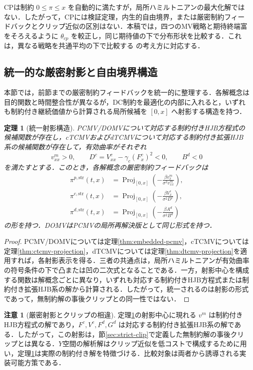\documentclass[10pt,a4paper]{article}
\theoremstyle{plain}
\newtheorem{theorem}{定理}
\theoremstyle{definition}
\newtheorem{remark}{注意}
\DeclareMathOperator{\Proj}{Proj}
\begin{document}
CPは制約 $0\leq\pi\leq x$ を自動的に満たすが，局所ハミルトニアンの最大化解ではない．したがって，CPには検証定理，内生的自由境界，または厳密制約フィードバックとクリップ近似の区別はない．本稿では，四つのMV戦略と期待終端富をそろえるように $\theta_{cp}$ を較正し，同じ期待値の下で分布形状を比較する．これは，異なる戦略を共通平均の下で比較する \citet{vanStadenDangForsyth2021} の考え方に対応する．

\subsection{統一的な厳密射影と自由境界構造}
\label{sec:unified}

本節では，前節までの厳密制約フィードバックを統一的に整理する．各解概念は目的関数と時間整合性が異なるが，DC制約を最適化の内部に入れると，いずれも制約付き継続価値から計算される局所候補を $[0,x]$ へ射影する構造を持つ．

\begin{theorem}[統一射影構造]
\label{thm:unified}
PCMV/DOMVについて対応する制約付きHJB方程式の候補関数が存在し，cTCMVおよびdTCMVについて対応する制約付き拡張HJB系の候補関数が存在して，有効曲率がそれぞれ
\[
  v_{xx}^m>0,
  \qquad
  D^c=V_{xx}^c-\gamma_c(F_x^c)^2<0,
  \qquad
  B^d<0
\]
を満たすとする．このとき，各解概念の厳密制約フィードバックは
\begin{align*}
  \pi^{p,\mathrm{str}}(t,x)&=\Proj_{[0,x]}
  \left(-\frac{\beta v_x^m}{\sigma^2v_{xx}^m}\right),\\
  \pi^{c,\mathrm{str}}(t,x)&=\Proj_{[0,x]}
  \left(-\frac{\beta V_x^c}{\sigma^2D^c}\right),\\
  \pi^{d,\mathrm{str}}(t,x)&=\Proj_{[0,x]}
  \left(-\frac{\beta A^d}{\sigma^2B^d}\right)
\end{align*}
の形を持つ．DOMVはPCMVの局所再解決版として同じ形式を持つ．
\end{theorem}

\begin{proof}
PCMV/DOMVについては定理\ref{thm:embedded-pcmv}，cTCMVについては定理\ref{thm:ctcmv-projection}，dTCMVについては定理\ref{thm:dtcmv-projection}を適用すれば，各射影表示を得る．三者の共通点は，局所ハミルトニアンが有効曲率の符号条件の下で凸または凹の二次式となることである．一方，射影中心を構成する関数は解概念ごとに異なり，いずれも対応する制約付きHJB方程式または制約付き拡張HJB系の解から計算される．したがって，統一されるのは射影の形式であって，無制約解の事後クリップとの同一性ではない．
\end{proof}

\begin{remark}[厳密射影とクリップの相違]
定理\ref{thm:unified}の射影中心に現れる $v^m$ は制約付きHJB方程式の解であり，$F^c,V^c,F^d,G^d$ は対応する制約付き拡張HJB系の解である．したがって，この射影は，節\ref{sec:strict-clip}で定義した無制約解の事後クリップとは異なる．$Y$空間の解析解はクリップ近似を低コストで構成するために用い，定理\ref{thm:unified}は実際の制約付き解を特徴づける．比較対象は両者から誘導される実装可能方策である．
\end{remark}
\end{document}
